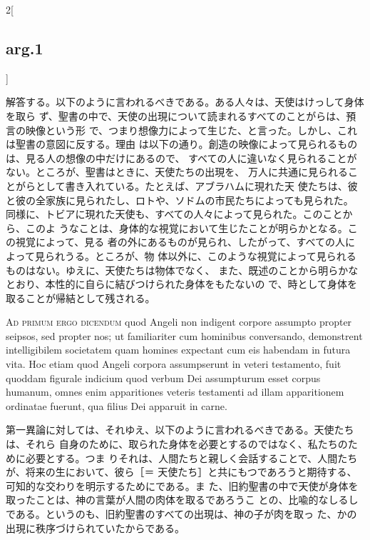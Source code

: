 \documentclass[paper=a4paper,fontsize=10pt,jafontsize=9pt,titlepage]{jlreq}
\begin{document}
\begin{paracol}{2}[\subsection{arg.1}]
\switchcolumn

解答する。以下のように言われるべきである。ある人々は、天使はけっして身体を取ら
ず、聖書の中で、天使の出現について読まれるすべてのことがらは、預言の映像という形
で、つまり想像力によって生じた、と言った。しかし、これは聖書の意図に反する。理由
は以下の通り。創造の映像によって見られるものは、見る人の想像の中だけにあるので、
すべての人に違いなく見られることがない。ところが、聖書はときに、天使たちの出現を、
万人に共通に見られることがらとして書き入れている。たとえば、アブラハムに現れた天
使たちは、彼と彼の全家族に見られたし、ロトや、ソドムの市民たちによっても見られた。
同様に、トビアに現れた天使も、すべての人々によって見られた。このことから、このよ
うなことは、身体的な視覚において生じたことが明らかとなる。この視覚によって、見る
者の外にあるものが見られ、したがって、すべての人によって見られうる。ところが、物
体以外に、このような視覚によって見られるものはない。ゆえに、天使たちは物体でなく、
また、既述のことから明らかなとおり、本性的に自らに結びつけられた身体をもたないの
で、時として身体を取ることが帰結として残される。

\switchcolumn*[\subsection{ad.1}]

{\scshape Ad primum ergo dicendum} quod Angeli non
indigent corpore assumpto propter seipsos, sed propter nos; ut
familiariter cum hominibus conversando, demonstrent intelligibilem
societatem quam homines expectant cum eis habendam in futura vita. Hoc
etiam quod Angeli corpora assumpserunt in veteri testamento, fuit
quoddam figurale indicium quod verbum Dei assumpturum esset corpus
humanum, omnes enim apparitiones veteris testamenti ad illam
apparitionem ordinatae fuerunt, qua filius Dei apparuit in carne.

\switchcolumn

第一異論に対しては、それゆえ、以下のように言われるべきである。天使たちは、それら
自身のために、取られた身体を必要とするのではなく、私たちのために必要とする。つま
りそれは、人間たちと親しく会話することで、人間たちが、将来の生において、彼ら［＝
天使たち］と共にもつであろうと期待する、可知的な交わりを明示するためにである。ま
た、旧約聖書の中で天使が身体を取ったことは、神の言葉が人間の肉体を取るであろうこ
との、比喩的なしるしである。というのも、旧約聖書のすべての出現は、神の子が肉を取っ
た、かの出現に秩序づけられていたからである。

\switchcolumn*[\subsection{ad.2}]


\end{paracol}
\end{document}
